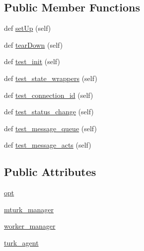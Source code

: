 \subsection*{Public Member Functions}
\begin{DoxyCompactItemize}
\item 
def \hyperlink{classparlai_1_1mturk_1_1core_1_1dev_1_1test_1_1test__mturk__agent_1_1TestMTurkAgent_af9ac563e4d2bc4deb3a804022bf98eab}{set\+Up} (self)
\item 
def \hyperlink{classparlai_1_1mturk_1_1core_1_1dev_1_1test_1_1test__mturk__agent_1_1TestMTurkAgent_ae8fbec62c492cb5ce4338ebff8dff264}{tear\+Down} (self)
\item 
def \hyperlink{classparlai_1_1mturk_1_1core_1_1dev_1_1test_1_1test__mturk__agent_1_1TestMTurkAgent_a0ff58816506507267ff9084573c41934}{test\+\_\+init} (self)
\item 
def \hyperlink{classparlai_1_1mturk_1_1core_1_1dev_1_1test_1_1test__mturk__agent_1_1TestMTurkAgent_af3269a504f0c00fc9de307153e55adbd}{test\+\_\+state\+\_\+wrappers} (self)
\item 
def \hyperlink{classparlai_1_1mturk_1_1core_1_1dev_1_1test_1_1test__mturk__agent_1_1TestMTurkAgent_a978ff70bb9e6e752c06f5c6db8e63d52}{test\+\_\+connection\+\_\+id} (self)
\item 
def \hyperlink{classparlai_1_1mturk_1_1core_1_1dev_1_1test_1_1test__mturk__agent_1_1TestMTurkAgent_aca082e5e552594724894f01f7dbc246b}{test\+\_\+status\+\_\+change} (self)
\item 
def \hyperlink{classparlai_1_1mturk_1_1core_1_1dev_1_1test_1_1test__mturk__agent_1_1TestMTurkAgent_a2b8a45bfee86cdd9e2a5ae10905b6334}{test\+\_\+message\+\_\+queue} (self)
\item 
def \hyperlink{classparlai_1_1mturk_1_1core_1_1dev_1_1test_1_1test__mturk__agent_1_1TestMTurkAgent_ad7bb0c1f6343a03be96731bd27670b3b}{test\+\_\+message\+\_\+acts} (self)
\end{DoxyCompactItemize}
\subsection*{Public Attributes}
\begin{DoxyCompactItemize}
\item 
\hyperlink{classparlai_1_1mturk_1_1core_1_1dev_1_1test_1_1test__mturk__agent_1_1TestMTurkAgent_ad8d2342c8e1e931ecc4af9e55196857c}{opt}
\item 
\hyperlink{classparlai_1_1mturk_1_1core_1_1dev_1_1test_1_1test__mturk__agent_1_1TestMTurkAgent_afd346baa958fb262d0e2681c3a39f298}{mturk\+\_\+manager}
\item 
\hyperlink{classparlai_1_1mturk_1_1core_1_1dev_1_1test_1_1test__mturk__agent_1_1TestMTurkAgent_abd98f41844b1325e2ebe61baec9e1581}{worker\+\_\+manager}
\item 
\hyperlink{classparlai_1_1mturk_1_1core_1_1dev_1_1test_1_1test__mturk__agent_1_1TestMTurkAgent_ad9a5d68dacd93bc427ed4f9eca011c46}{turk\+\_\+agent}
\end{DoxyCompactItemize}


